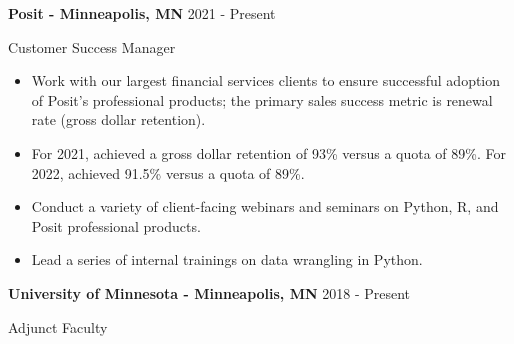 \documentclass[11pt,a4paper,]{awesome-cv}
\begin{document}
\textbf{Posit - Minneapolis, MN} \hfill 2021 - Present

\vspace{-1ex}

Customer Success Manager

\vspace{-1.5ex}

\small

\begin{itemize}
\item
  Work with our largest financial services clients to ensure successful
  adoption of Posit's professional products; the primary sales success
  metric is renewal rate (gross dollar retention). \vspace{-0.5ex}
\item
  For 2021, achieved a gross dollar retention of 93\% versus a quota of
  89\%. For 2022, achieved 91.5\% versus a quota of 89\%.
  \vspace{-0.5ex}
\item
  Conduct a variety of client-facing webinars and seminars on Python, R,
  and Posit professional products. \vspace{-0.5ex}
\item
  Lead a series of internal trainings on data wrangling in Python.
  \vspace{-0.5ex}
\end{itemize}

\normalsize

\textbf{University of Minnesota - Minneapolis, MN} \hfill 2018 - Present

\vspace{-1ex}

Adjunct Faculty

\vspace{-1.5ex}

\small
\end{document}
